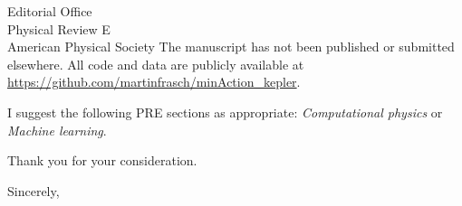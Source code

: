 \documentclass[12pt]{letter}
\begin{document}
\begin{letter}{Editorial Office\\Physical Review E\\American Physical Society}
The manuscript has not been published or submitted elsewhere. All code and data are publicly available at \url{https://github.com/martinfrasch/minAction_kepler}.

I suggest the following PRE sections as appropriate: \textit{Computational physics} or \textit{Machine learning}.

Thank you for your consideration.

\closing{Sincerely,}

\end{letter}
\end{document}
